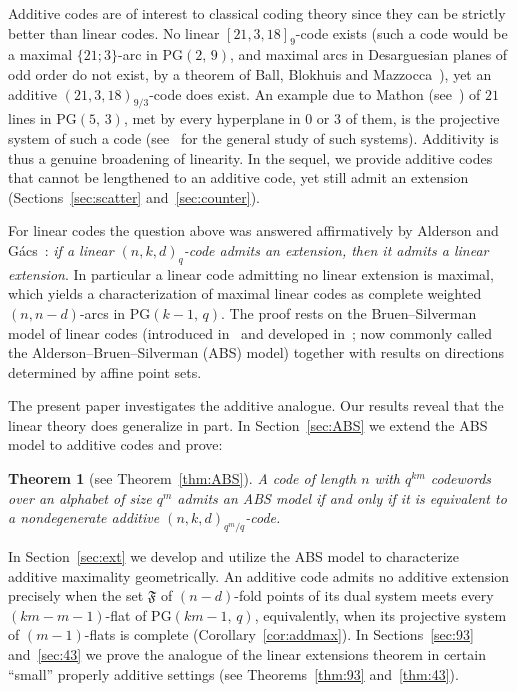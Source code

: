 \documentclass[12pt]{article}
\newtheorem{thm}{Theorem}[section]
\theoremstyle{definition}
\numberwithin{equation}{section}
\newcommand{\PG}[2]{\mathrm{PG}(#1,\,#2)}
\newcommand{\Afold}{\mathfrak{F}}
\begin{document}
Additive codes are of interest to classical coding theory since they can be strictly better than linear codes.  No linear $[21,3,18]_9$-code exists (such a code would be a maximal $\{21;3\}$-arc in $\PG29$, and maximal arcs in Desarguesian planes of odd order do not exist, by a theorem of Ball, Blokhuis and Mazzocca~\cite{BBM97}), yet an additive $(21,3,18)_{9/3}$-code does exist. An example due to Mathon (see~\cite{DDHM02}) of $21$ lines in $\PG53$, met by every hyperplane in $0$ or $3$ of them, is the projective system of such a code (see~\cite{AldersonBall26} for the general study of such systems).  Additivity is thus a genuine broadening of linearity.  
In the sequel, we provide additive codes that cannot be lengthened to an additive code, yet still admit an extension
(Sections~\ref{sec:scatter} and~\ref{sec:counter}).

For linear codes the question above was answered affirmatively by Alderson and G\'acs~\cite{MR2529622}: \textit{if a linear $(n,k,d)_q$-code admits an extension, then it admits a linear extension}.  In particular a linear code admitting no linear extension is maximal, which yields a characterization of maximal linear codes as complete weighted $(n,n-d)$-arcs in $\PG{k-1}{q}$.  The proof rests on the Bruen--Silverman model of linear codes (introduced in~\cite{ALD} and developed
in~\cite{AB1,AB3}; now commonly called the Alderson--Bruen--Silverman (ABS) model) together with results on directions determined by affine point sets.

The present paper investigates the additive analogue.  Our results reveal that the linear theory does generalize in part. In Section~\ref{sec:ABS} we extend the ABS model to additive codes and
prove:

\begin{thm}[see Theorem~\ref{thm:ABS}]\label{thm:ABS_intro}
A code of length $n$ with $q^{km}$ codewords over an alphabet of size $q^m$ admits an ABS model if and only if it is equivalent to a nondegenerate additive $(n,k,d)_{q^m/q}$-code.
\end{thm}

In Section~\ref{sec:ext} we develop and utilize the ABS model to characterize additive maximality geometrically. An additive code admits no additive extension precisely when the set $\Afold$ of $(n-d)$-fold points of its dual system meets every $(km-m-1)$-flat of $\PG{km-1}{q}$, equivalently, when its projective system of $(m-1)$-flats is complete (Corollary~\ref{cor:addmax}).  In Sections~\ref{sec:93} and~\ref{sec:43} we prove the analogue of the linear extensions theorem in certain ``small'' properly additive settings (see Theorems~\ref{thm:93} and~\ref{thm:43}).
\end{document}
